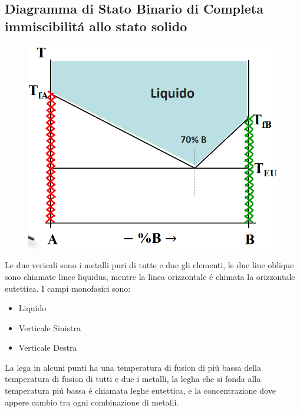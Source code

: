\documentclass{article}
\begin{document}
{        \subsection{Diagramma di Stato Binario di Completa immiscibilit\'a allo stato solido}
            \begin{figure}[!h]
                \centering
                \includegraphics[width=.85\linewidth]{Diagramma di stato binario di completa immiscibilita allo stato solido per una soluzione basilare.png}
            \end{figure}
            Le due vericali sono i metalli puri di tutte e due gli elementi, le due line oblique sono chiamate linee liquidus, mentre la linea orizzontale \'e chimata la orizzontale eutettica.
            I campi monofasici sono:
            \begin{itemize}
                \item Liquido
                \item Verticale Sinistra
                \item Verticale Destra
            \end{itemize}
            La lega in alcuni punti ha una temperatura di fusion di pi\'u bassa della temperatura di fusion di tutti e due i metalli, la legha che si fonda alla temperatura pi\'u bassa \'e chiamata leghe eutettica, e la concentrazione dove appere cambio tra ogni combinazione di metalli.
}
\end{document}
